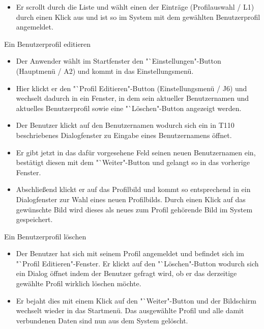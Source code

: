 \begin{requirements}
\begin{itemize}
  			\item Er scrollt durch die Liste und wählt einen der Einträge (Profilauswahl / L1) durch einen Klick aus und ist so im System mit dem gewählten Benutzerprofil angemeldet.
  			
	\end{itemize}
  	
  	
	
	 Ein Benutzerprofil editieren
	
	
	\begin{itemize}
  			\item Der Anwender wählt im Startfenster den "`Einstellungen"-Button (Hauptmenü / A2) und kommt in das Einstellungsmenü.
  			
  			\item Hier klickt er den "`Profil Editieren"-Button (Einstellungsmenü / J6) und wechselt dadurch in ein Fenster, in dem sein aktueller Benutzernamen und aktuelles Benutzerprofil sowie eine "`Löschen"-Button angezeigt werden.
  			
  			\item Der Benutzer klickt auf den Benutzernamen wodurch sich ein in T110 beschriebenes Dialogfenster zu Eingabe eines Benutzernamens öffnet.
  			
  			\item Er gibt jetzt in das dafür vorgesehene Feld seinen neuen Benutzernamen ein, bestätigt diesen mit dem "`Weiter"-Button und gelangt so in das vorherige Fenster.
  			
  			\item Abschließend klickt er auf das Profilbild und kommt so entsprechend in ein Dialogfenster zur Wahl eines neuen Profilbilds. Durch einen Klick auf das gewünschte Bild wird dieses als neues zum Profil gehörende Bild im System gespeichert.
  			
  			
  	\end{itemize}

  	
	
	
	 Ein Benutzerprofil löschen
	
	
	\begin{itemize}
  			\item Der Benutzer hat sich mit seinem Profil angemeldet und befindet sich im "`Profil Editieren"-Fenster. Er klickt auf den "`Löschen"-Button wodurch sich ein Dialog öffnet indem der Benutzer gefragt wird, ob er das derzeitige gewählte Profil wirklich löschen möchte.
  			
  			\item Er bejaht dies mit einem Klick auf den "`Weiter"-Button und der Bildschirm wechselt wieder in das Startmenü. Das ausgewählte Profil und alle damit verbundenen Daten sind nun aus dem System gelöscht.
  			

\end{itemize}
\end{requirements}
